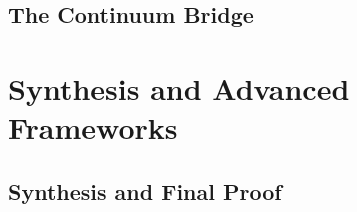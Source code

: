 \documentclass[11pt,a4paper]{report}
\begin{document}
\chapter{The Continuum Bridge}
\label{ch:continuum-appendix}
\label{ch:rg-analysis}
\label{ch:weak_coupling}


\clearpage





% 


\part{Synthesis and Advanced Frameworks}
\chapter{Synthesis and Final Proof}
\label{ch:synthesis_final_proof}
\label{ch:spectral-gap}
%

%
%
%
%
%







\end{document}
